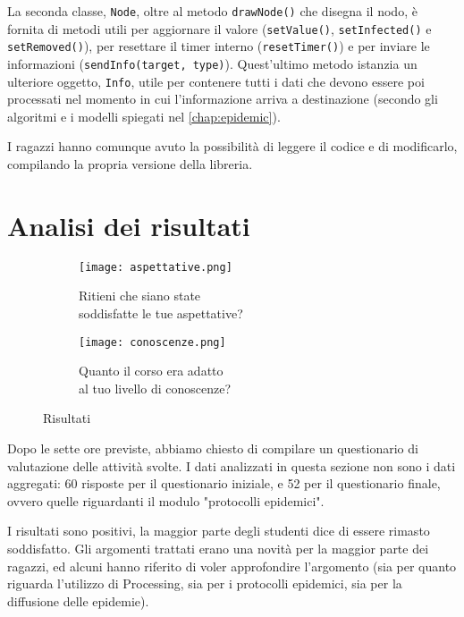 La seconda classe, \texttt{Node}, oltre al metodo \texttt{drawNode()} che disegna il nodo, è fornita di metodi utili per aggiornare il valore (\texttt{setValue()}, \texttt{setInfected()} e \texttt{setRemoved()}), per resettare il timer interno (\texttt{resetTimer()}) e per inviare le informazioni (\texttt{sendInfo(target, type)}). Quest'ultimo metodo istanzia un ulteriore oggetto, \texttt{Info}, utile per contenere tutti i dati che devono essere poi processati nel momento in cui l'informazione arriva a destinazione (secondo gli algoritmi e i modelli spiegati nel \autoref{chap:epidemic}).

I ragazzi hanno comunque avuto la possibilità di leggere il codice e di modificarlo, compilando la propria versione della libreria.
\section{Analisi dei risultati}

\begin{figure}[ht]
    
    \begin{subfigure}{.5\textwidth}
        \centering
        \texttt{[image: aspettative.png]}
        \captionsetup{justification=centering}
        \caption{Ritieni che siano state \\ soddisfatte le tue aspettative?} 
    \end{subfigure}\hfill
    \begin{subfigure}{.5\textwidth}
        \centering
        \texttt{[image: conoscenze.png]}
        \captionsetup{justification=centering}
        \caption{Quanto il corso era adatto  \\ al tuo livello di conoscenze?} 
    \end{subfigure}
    \caption{Risultati}
\end{figure} 

Dopo le sette ore previste, abbiamo chiesto di compilare un questionario di valutazione delle attività svolte.  I dati analizzati in questa sezione non sono i dati aggregati: 60 risposte per il questionario iniziale, e 52 per il questionario finale, ovvero quelle riguardanti il modulo "protocolli epidemici".

I risultati sono positivi, la maggior parte degli studenti dice di essere rimasto soddisfatto. Gli argomenti trattati erano una novità per la maggior parte dei ragazzi, ed alcuni hanno riferito di voler approfondire l'argomento (sia per quanto riguarda l'utilizzo di Processing, sia per i protocolli epidemici, sia per la diffusione delle epidemie). 

